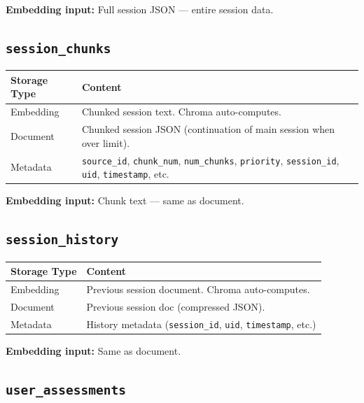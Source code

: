 \documentclass[11pt]{article}
\begin{document}
\textbf{Embedding input:} Full session JSON --- entire session data.

\subsection{\texttt{session\_chunks}}

\begin{table}[h]
\centering
\begin{tabular}{@{}p{2.2cm}p{11cm}@{}}
\toprule
\textbf{Storage Type} & \textbf{Content} \\
\midrule
Embedding & Chunked session text. Chroma auto-computes. \\
\midrule
Document & Chunked session JSON (continuation of main session when over limit). \\
\midrule
Metadata & \texttt{source\_id}, \texttt{chunk\_num}, \texttt{num\_chunks}, \texttt{priority}, \texttt{session\_id}, \texttt{uid}, \texttt{timestamp}, etc. \\
\bottomrule
\end{tabular}
\end{table}

\textbf{Embedding input:} Chunk text --- same as document.

\subsection{\texttt{session\_history}}

\begin{table}[h]
\centering
\begin{tabular}{@{}p{2.2cm}p{11cm}@{}}
\toprule
\textbf{Storage Type} & \textbf{Content} \\
\midrule
Embedding & Previous session document. Chroma auto-computes. \\
\midrule
Document & Previous session doc (compressed JSON). \\
\midrule
Metadata & History metadata (\texttt{session\_id}, \texttt{uid}, \texttt{timestamp}, etc.) \\
\bottomrule
\end{tabular}
\end{table}

\textbf{Embedding input:} Same as document.

\subsection{\texttt{user\_assessments}}
\end{document}
